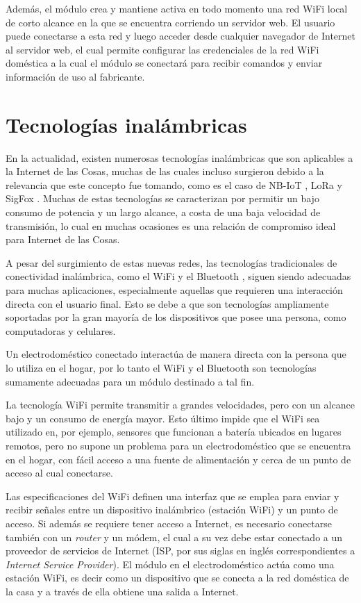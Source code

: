 Además, el módulo crea y mantiene activa en todo momento una red WiFi local de corto alcance en la que se encuentra corriendo un servidor web. El usuario puede conectarse a esta red y luego acceder desde cualquier navegador de Internet al servidor web, el cual permite configurar las credenciales de la red WiFi doméstica a la cual el módulo se conectará para recibir comandos y enviar información de uso al fabricante.

\section{Tecnologías inalámbricas}

En la actualidad, existen numerosas tecnologías inalámbricas que son aplicables a la Internet de las Cosas, muchas de las cuales incluso surgieron debido a la relevancia que este concepto fue tomando, como es el caso de NB-IoT \citep{nb_iot}, LoRa \citep{lora} y SigFox \citep{sigfox}. Muchas de estas tecnologías se caracterizan por permitir un bajo consumo de potencia y un largo alcance, a costa de una baja velocidad de transmisión, lo cual en muchas ocasiones es una relación de compromiso ideal para Internet de las Cosas.

A pesar del surgimiento de estas nuevas redes, las tecnologías tradicionales de conectividad inalámbrica, como el WiFi \citep{wifi} y el Bluetooth \citep{bluetooth}, siguen siendo adecuadas para muchas aplicaciones, especialmente aquellas que requieren una interacción directa con el usuario final. Esto se debe a que son tecnologías ampliamente soportadas por la gran mayoría de los dispositivos que posee una persona, como computadoras y celulares.

Un electrodoméstico conectado interactúa de manera directa con la persona que lo utiliza en el hogar, por lo tanto el WiFi y el Bluetooth son tecnologías sumamente adecuadas para un módulo destinado a tal fin.

La tecnología WiFi permite transmitir a grandes velocidades, pero con un alcance bajo y un consumo de energía mayor. Esto último impide que el WiFi sea utilizado en, por ejemplo, sensores que funcionan a batería ubicados en lugares remotos, pero no supone un problema para un electrodoméstico que se encuentra en el hogar, con fácil acceso a una fuente de alimentación y cerca de un punto de acceso al cual conectarse. 

Las especificaciones del WiFi definen una interfaz que se emplea para enviar y recibir señales entre un dispositivo inalámbrico (estación WiFi) y un punto de acceso. Si además se requiere tener acceso a Internet, es necesario conectarse también con un \emph{router} y un módem, el cual a su vez debe estar conectado a un proveedor de servicios de Internet (ISP, por sus siglas en inglés correspondientes a \emph{Internet Service Provider}). El módulo en el electrodoméstico actúa como una estación WiFi, es decir como un dispositivo que se conecta a la red doméstica de la casa y a través de ella obtiene una salida a Internet.


